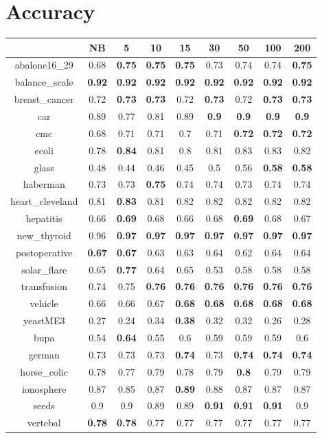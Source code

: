 \documentclass{article}%
\begin{document}
%
\normalsize%
\section*{Accuracy}%
\begin{tabular}{c|cccccccc}%
\hline%
&NB&5&10&15&30&50&100&200\\%
\hline%
abalone16\_29&0.68&\textbf{0.75}&\textbf{0.75}&\textbf{0.75}&0.73&0.74&0.74&\textbf{0.75}\\%
\hline%
balance\_scale&\textbf{0.92}&\textbf{0.92}&\textbf{0.92}&\textbf{0.92}&\textbf{0.92}&\textbf{0.92}&\textbf{0.92}&\textbf{0.92}\\%
\hline%
breast\_cancer&0.72&\textbf{0.73}&\textbf{0.73}&0.72&\textbf{0.73}&0.72&\textbf{0.73}&\textbf{0.73}\\%
\hline%
car&0.89&0.77&0.81&0.89&\textbf{0.9}&\textbf{0.9}&\textbf{0.9}&\textbf{0.9}\\%
\hline%
cmc&0.68&0.71&0.71&0.7&0.71&\textbf{0.72}&\textbf{0.72}&\textbf{0.72}\\%
\hline%
ecoli&0.78&\textbf{0.84}&0.81&0.8&0.81&0.83&0.83&0.82\\%
\hline%
glass&0.48&0.44&0.46&0.45&0.5&0.56&\textbf{0.58}&\textbf{0.58}\\%
\hline%
haberman&0.73&0.73&\textbf{0.75}&0.74&0.74&0.73&0.74&0.74\\%
\hline%
heart\_cleveland&0.81&\textbf{0.83}&0.81&0.82&0.82&0.82&0.82&0.82\\%
\hline%
hepatitis&0.66&\textbf{0.69}&0.68&0.66&0.68&\textbf{0.69}&0.68&0.67\\%
\hline%
new\_thyroid&0.96&\textbf{0.97}&\textbf{0.97}&\textbf{0.97}&\textbf{0.97}&\textbf{0.97}&\textbf{0.97}&\textbf{0.97}\\%
\hline%
postoperative&\textbf{0.67}&\textbf{0.67}&0.63&0.63&0.64&0.62&0.64&0.64\\%
\hline%
solar\_flare&0.65&\textbf{0.77}&0.64&0.65&0.53&0.58&0.58&0.58\\%
\hline%
transfusion&0.74&0.75&\textbf{0.76}&\textbf{0.76}&\textbf{0.76}&\textbf{0.76}&\textbf{0.76}&\textbf{0.76}\\%
\hline%
vehicle&0.66&0.66&0.67&\textbf{0.68}&\textbf{0.68}&\textbf{0.68}&\textbf{0.68}&\textbf{0.68}\\%
\hline%
yeastME3&0.27&0.24&0.34&\textbf{0.38}&0.32&0.32&0.26&0.28\\%
\hline%
bupa&0.54&\textbf{0.64}&0.55&0.6&0.59&0.59&0.59&0.6\\%
\hline%
german&0.73&0.73&0.73&\textbf{0.74}&0.73&\textbf{0.74}&\textbf{0.74}&\textbf{0.74}\\%
\hline%
horse\_colic&0.78&0.77&0.79&0.78&0.79&\textbf{0.8}&0.79&0.79\\%
\hline%
ionosphere&0.87&0.85&0.87&\textbf{0.89}&0.88&0.87&0.87&0.87\\%
\hline%
seeds&0.9&0.9&0.89&0.89&\textbf{0.91}&\textbf{0.91}&\textbf{0.91}&0.9\\%
\hline%
vertebal&\textbf{0.78}&\textbf{0.78}&0.77&0.77&0.77&0.77&0.77&0.77\\%
\hline%
\end{tabular}
\end{document}

